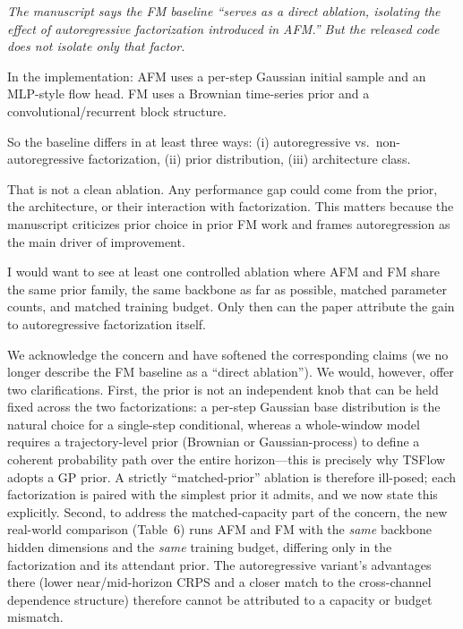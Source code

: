 \documentclass[11pt]{article}
\newcommand{\reviewertext}[1]{%
  \begin{reviewerquote}
    {\color{reviewercolor}\itshape #1}
  \end{reviewerquote}%
}
\newcommand{\authorresponse}[1]{%
    #1\par\medskip
}
\begin{document}
\reviewertext{%
The manuscript says the FM baseline ``serves as a direct ablation, isolating the effect of autoregressive factorization introduced in AFM.'' But the released code does not isolate only that factor.

In the implementation: AFM uses a per-step Gaussian initial sample and an MLP-style flow head. FM uses a Brownian time-series prior and a convolutional/recurrent block structure.

So the baseline differs in at least three ways: (i) autoregressive vs.\ non-autoregressive factorization, (ii) prior distribution, (iii) architecture class.

That is not a clean ablation. Any performance gap could come from the prior, the architecture, or their interaction with factorization. This matters because the manuscript criticizes prior choice in prior FM work and frames autoregression as the main driver of improvement.

I would want to see at least one controlled ablation where AFM and FM share the same prior family, the same backbone as far as possible, matched parameter counts, and matched training budget. Only then can the paper attribute the gain to autoregressive factorization itself.
}

\authorresponse{%
We acknowledge the concern and have softened the corresponding claims (we no longer describe the FM baseline as a ``direct ablation''). We would, however, offer two clarifications. First, the prior is not an independent knob that can be held fixed across the two factorizations: a per-step Gaussian base distribution is the natural choice for a single-step conditional, whereas a whole-window model requires a trajectory-level prior (Brownian or Gaussian-process) to define a coherent probability path over the entire horizon---this is precisely why TSFlow adopts a GP prior. A strictly ``matched-prior'' ablation is therefore ill-posed; each factorization is paired with the simplest prior it admits, and we now state this explicitly. Second, to address the matched-capacity part of the concern, the new real-world comparison (Table~6) runs AFM and FM with the \emph{same} backbone hidden dimensions and the \emph{same} training budget, differing only in the factorization and its attendant prior. The autoregressive variant's advantages there (lower near/mid-horizon CRPS and a closer match to the cross-channel dependence structure) therefore cannot be attributed to a capacity or budget mismatch.

}
\end{document}
